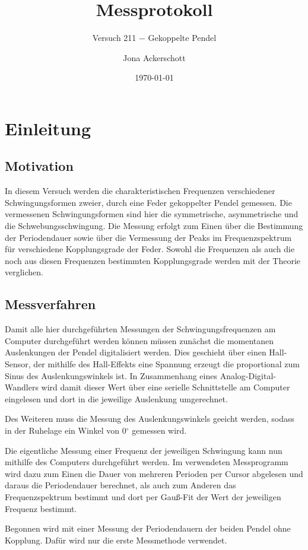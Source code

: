 \documentclass[12pt,a4paper,german]{scrartcl}
\author{Jona Ackerschott}
\title{Messprotokoll}
\subtitle{Versuch 211 $-$ Gekoppelte Pendel}
\date{\today}
\numberwithin{equation}{section}
\begin{document}
  \maketitle

  \tableofcontents

  \section{Einleitung}
  \subsection{Motivation}
  In diesem Versuch werden die charakteristischen Frequenzen verschiedener Schwingungsformen zweier, durch eine Feder gekoppelter Pendel gemessen.
  Die vermessenen Schwingungsformen sind hier die symmetrische, asymmetrische und die Schwebungsschwingung.
  Die Messung erfolgt zum Einen über die Bestimmung der Periodendauer sowie über die Vermessung der Peaks im Frequenzspektrum für verschiedene Kopplungsgrade der Feder.
  Sowohl die Frequenzen als auch die noch aus diesen Frequenzen bestimmten Kopplungsgrade werden mit der Theorie verglichen.

  \subsection{Messverfahren}
  Damit alle hier durchgeführten Messungen der Schwingungsfrequenzen am Computer durchgeführt werden können müssen zunächst die momentanen Auslenkungen der Pendel digitalisiert werden.
  Dies geschieht über einen Hall-Sensor, der mithilfe des Hall-Effekts eine Spannung erzeugt die proportional zum Sinus des Auslenkungswinkels ist.
  In Zusammenhang eines Analog-Digital-Wandlers wird damit dieser Wert über eine serielle Schnittstelle am Computer eingelesen und dort in die jeweilige Auslenkung umgerechnet.

  Des Weiteren muss die Messung des Auslenkungswinkels geeicht werden, sodass in der Ruhelage ein Winkel von 0$^\circ$ gemessen wird.

  Die eigentliche Messung einer Frequenz der jeweiligen Schwingung kann nun mithilfe des Computers durchgeführt werden.
  Im verwendeten Messprogramm wird dazu zum Einen die Dauer von mehreren Perioden per Cursor abgelesen und daraus die Periodendauer berechnet, als auch zum Anderen das Frequenzspektrum bestimmt und dort per Gauß-Fit der Wert der jeweiligen Frequenz bestimmt.

  Begonnen wird mit einer Messung der Periodendauern der beiden Pendel ohne Kopplung.
  Dafür wird nur die erste Messmethode verwendet.
\end{document}

